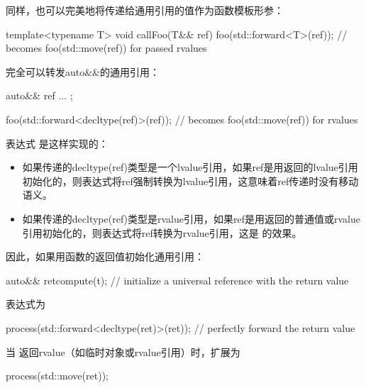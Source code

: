 同样，也可以完美地将传递给通用引用的值作为函数模板形参：

\begin{cppcode}
template<typename T>
void callFoo(T&& ref) {
	foo(std::forward<T>(ref)); // becomes foo(std::move(ref)) for passed rvalues
}
\end{cppcode}

完全可以转发auto\&\&的通用引用：

\begin{cppcode}
auto&& ref{ ... };

foo(std::forward<decltype(ref)>(ref)); // becomes foo(std::move(ref)) for rvalues
\end{cppcode}

表达式  是这样实现的：

\begin{itemize}
	\item 如果传递的decltype(ref)类型是一个lvalue引用，如果ref是用返回的lvalue引用初始化的，则表达式将ref强制转换为lvalue引用，这意味着ref传递时没有移动语义。
	\item 如果传递的decltype(ref)类型是rvalue引用，如果ref是用返回的普通值或rvalue引用初始化的，则表达式将ref转换为rvalue引用，这是  的效果。
\end{itemize}

因此，如果用函数的返回值初始化通用引用：

\begin{cppcode}
auto&& ret{compute(t)}; // initialize a universal reference with the return value
\end{cppcode}

表达式为

\begin{cppcode}
process(std::forward<decltype(ret)>(ret)); // perfectly forward the return value
\end{cppcode}

当  返回rvalue（如临时对象或rvalue引用）时，扩展为

\begin{cppcode}
process(std::move(ret));
\end{cppcode}
























